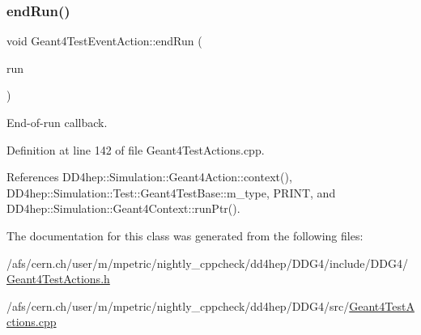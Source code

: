 \hypertarget{class_d_d4hep_1_1_simulation_1_1_test_1_1_geant4_test_event_action_ad5a3426363b043ddd19476871cd4a93c}{}\label{class_d_d4hep_1_1_simulation_1_1_test_1_1_geant4_test_event_action_ad5a3426363b043ddd19476871cd4a93c} 
\subsubsection{\texorpdfstring{end\+Run()}{endRun()}}
{\footnotesize\ttfamily void Geant4\+Test\+Event\+Action\+::end\+Run (\begin{DoxyParamCaption}\item[{const G4\+Run $\ast$}]{run }\end{DoxyParamCaption})}



End-\/of-\/run callback. 



Definition at line 142 of file Geant4\+Test\+Actions.\+cpp.



References D\+D4hep\+::\+Simulation\+::\+Geant4\+Action\+::context(), D\+D4hep\+::\+Simulation\+::\+Test\+::\+Geant4\+Test\+Base\+::m\+\_\+type, P\+R\+I\+NT, and D\+D4hep\+::\+Simulation\+::\+Geant4\+Context\+::run\+Ptr().



The documentation for this class was generated from the following files\+:\begin{DoxyCompactItemize}
\item 
/afs/cern.\+ch/user/m/mpetric/nightly\+\_\+cppcheck/dd4hep/\+D\+D\+G4/include/\+D\+D\+G4/\hyperlink{_geant4_test_actions_8h}{Geant4\+Test\+Actions.\+h}\item 
/afs/cern.\+ch/user/m/mpetric/nightly\+\_\+cppcheck/dd4hep/\+D\+D\+G4/src/\hyperlink{_geant4_test_actions_8cpp}{Geant4\+Test\+Actions.\+cpp}\end{DoxyCompactItemize}

